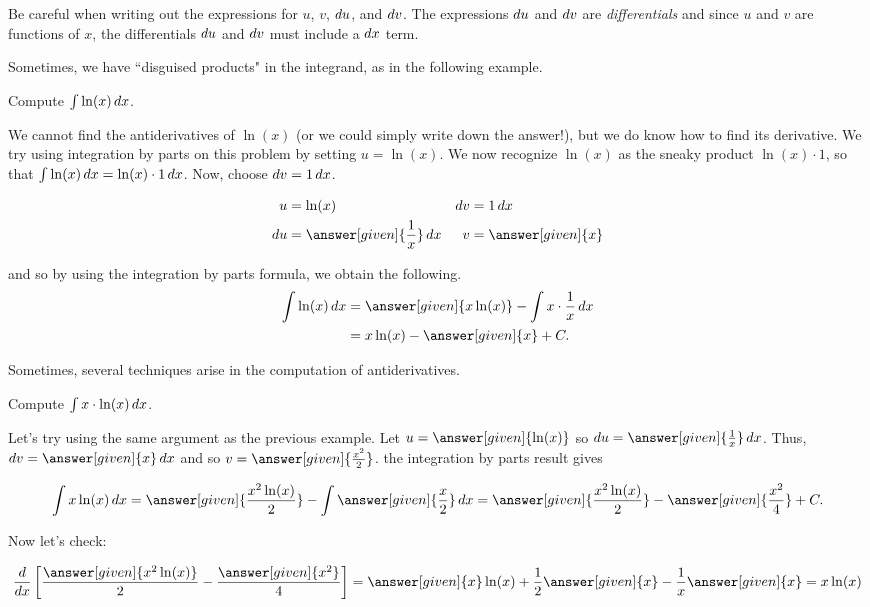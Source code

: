 \documentclass[noauthor]{ximera}
\begin{document}
\begin{warning}
Be careful when writing out the expressions for $u$, $v$, $\mathop{}\!d u$, and $\mathop{}\!d v$.  The expressions $\mathop{}\!d u$ and $\mathop{}\!d v$ are \emph{differentials} and since $u$ and $v$ are functions of $x$, the differentials $\mathop{}\!d u$ and $\mathop{}\!d v$ must include a $\mathop{}\!d x$ term.
\end{warning}

Sometimes, we have ``disguised products" in the integrand, as in the following example.

\begin{example}
Compute $\int \ln(x)\mathop{}\!d x$.

\begin{explanation}
We cannot find the antiderivatives of $\ln(x)$ (or we could simply write down the answer!), but we do know how to find its derivative.  We try using integration by parts on this problem by setting $u=\ln(x)$.  We now recognize $\ln(x)$ as the sneaky product $\ln(x) \cdot 1$, so that $\int \ln(x) \mathop{}\!d x = \ln(x) \cdot 1 \mathop{}\!d x$.  Now, choose $\mathop{}\!d v = 1 \mathop{}\!d x$.

\begin{align*}
u &= \ln(x) & \d v & =1 \d x \\
 \d u &= \answer[given]{\frac{1}{x}} \d x & v&= \answer[given]{x}
\end{align*}

and so by using the integration by parts formula, we obtain the following.
\begin{align*}
 \int \ln(x)\d x&=\answer[given]{x \ln(x)}-\int x \cdot \frac{1}{x}\d x\\
&= x\ln (x)- \answer[given]{x}+C.\\
\end{align*}
\end{explanation}
\end{example}

Sometimes, several techniques arise in the computation of antiderivatives.

\begin{example}
Compute $\int x\cdot \ln(x) \mathop{}\!d x$.

\begin{explanation}
Let's try using the same argument as the previous example.  Let $u=\answer[given]{\ln(x)}$ so $\d u=\answer[given]{\frac{1}{x}} \d x$. Thus, $\d v=\answer[given]{x} \d x$ and so $v=\answer[given]{\frac{x^2}{2}}$.  the integration by parts result gives


\[
\int x\ln(x) \d x= \answer[given]{\frac{x^2\ln(x)}{2}} - \int \answer[given]{\frac{x}{2}} \d x = \answer[given]{\frac{x^2\ln(x)}{2}} - \answer[given]{\frac{x^2}{4}} +C.
\]

Now let's check:

\[
  \ddx \left[ \frac{\answer[given]{x^2\ln(x)}}{2} - \frac{\answer[given]{x^2}}{4} \right] = \answer[given]{x}\ln(x) + \frac{1}{2}\answer[given]{x} - \frac{1}{x}\answer[given]{x} = x\ln(x)
\]

\end{explanation}

\end{example}
\end{document}

